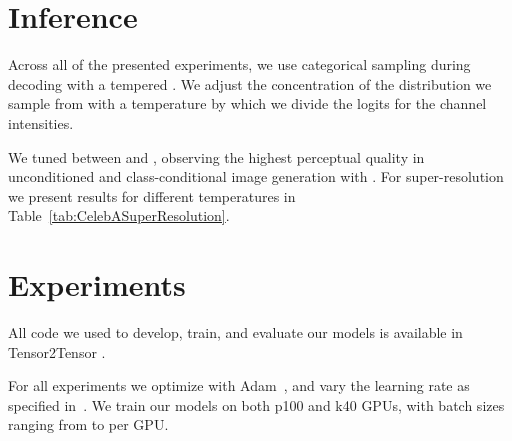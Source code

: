 \documentclass{article}
\begin{document}
\section{Inference}
Across all of the presented experiments, we use categorical sampling during decoding with a tempered  \citep{PixelRecursiveSuperResolution}. We adjust the concentration of the distribution we sample from with a temperature  by which we divide the logits for the channel intensities.

We tuned  between  and , observing the highest perceptual quality in unconditioned and class-conditional image generation with  .
For super-resolution we present results for different temperatures in Table~\ref{tab:CelebASuperResolution}.
 
\section{Experiments}
All code we used to develop, train, and evaluate our models is available in Tensor2Tensor \citep{tensor2tensor}.


For all experiments we optimize with Adam~\citep{kingma2014adam}, and vary the learning rate as specified in~\cite{aiayn}. We train our models on both p100 and k40 GPUs, with batch sizes ranging from  to  per GPU.
\end{document}
